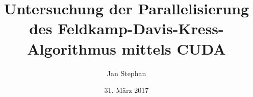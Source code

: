 \documentclass[utf8,german,beleg]{zihpub}
\author{Jan Stephan}
\title{Untersuchung der Parallelisierung des Feldkamp-Davis-Kress-Algorithmus mittels CUDA}
\date{31. März 2017}
\begin{document}
\printglossaries
\listoffigures
\listoflistings
\listoftables








\end{document}
